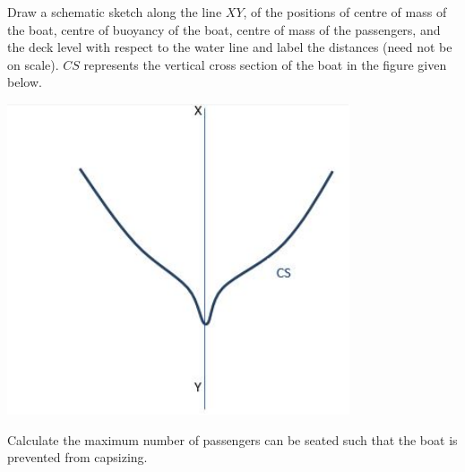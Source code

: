 {\prob
Draw a schematic sketch along the line $XY$, of the positions of centre of mass of the boat, centre of buoyancy of the boat, centre of mass of the passengers, and the deck level with respect to the water line and label the distances (need not be on scale). $CS$ represents the vertical cross section of the boat in the figure given below.
\begin{center}
  \includegraphics[width=0.5\linewidth]{2021-t-02-p4}
\end{center}

\prob
Calculate the maximum number of passengers can be seated such that the boat is prevented from capsizing.
\fi



\fi



\fi



\fi



\fi


\ifHint

\fi


\ifSolution

\fi


\ifEstStatement

\fi



\fi



\fi



\fi



\fi


\ifEstHint

\fi


\ifEstSolution

\fi
}
